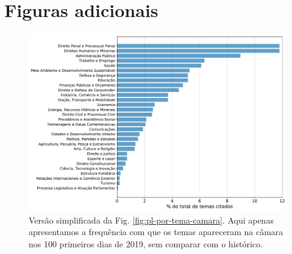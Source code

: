 \documentclass[12pt,a4paper]{article}
\begin{document}
{\footnotesize

}

{\footnotesize

}


\section{Figuras adicionais}

\begin{figure}[H]
\centering
\includegraphics[width=1.0\textwidth]{graficos/temas_PL_fracao2019_2019-05-03.pdf}
\caption{Versão simplificada da Fig. \ref{fig:pl-por-tema-camara}. Aqui apenas apresentamos a frequência com
  que os temas apareceram na câmara nos 100 primeiros dias de 2019, sem comparar com o histórico.}
\label{fig:pl-por-tema-camara-simples}
\end{figure}
\end{document}
